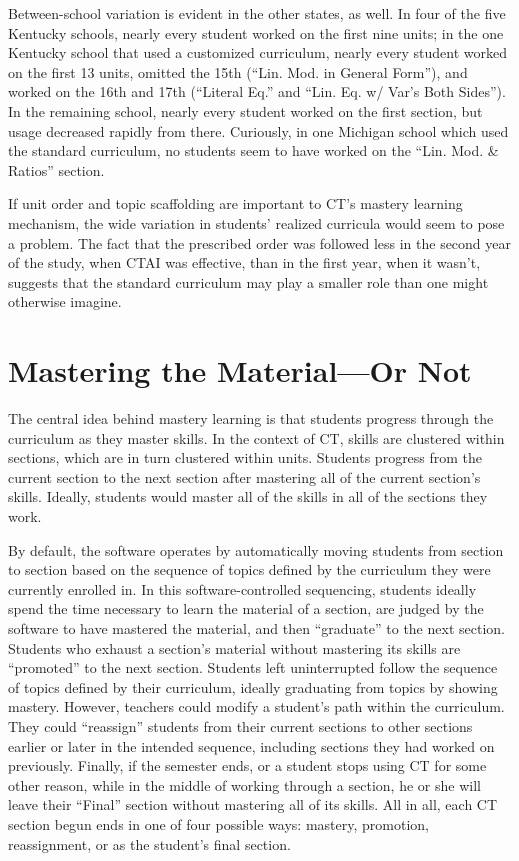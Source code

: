 \documentclass[12pt]{article}\usepackage[]{graphicx}\usepackage[]{color}
\begin{document}
Between-school variation is evident in the other states, as well.
In four of the five Kentucky schools, nearly every student worked on
the first nine units; in the one Kentucky school that used a
customized curriculum, nearly every student worked on the first 13
units, omitted the 15th (``Lin. Mod. in General Form''), and worked on
the 16th and 17th (``Literal Eq.'' and ``Lin. Eq. w/ Var's Both Sides'').
In the remaining school, nearly every student worked on the first
section, but usage decreased rapidly from there.
Curiously, in one Michigan school which used the standard curriculum,
no students seem to have worked on the ``Lin. Mod. \& Ratios'' section.

If unit order and topic scaffolding are important to CT's mastery
learning mechanism, the wide variation in students' realized curricula
would seem to pose a problem.
The fact that the prescribed order was followed less in the second
year of the study, when CTAI was effective, than in the first year,
when it wasn't, suggests that the standard curriculum may play a
smaller role than one might otherwise imagine.

\section{Mastering the Material---Or Not}\label{sec:mastery}
The central idea behind mastery learning is that students progress
through the curriculum as they master skills.
In the context of CT, skills are clustered within sections, which are
in turn clustered within units.
Students progress from the current section to the next section after
mastering all of the current section's skills.
Ideally, students would master all of the skills in all of the
sections they work.

By default, the software operates by automatically moving students
from section to section based on the sequence of topics defined by the
curriculum they were currently enrolled in. In this
software-controlled sequencing, students ideally spend the time
necessary to learn the material of a section, are judged by the
software to have mastered the material, and then ``graduate'' to the
next section. Students who exhaust a section's material without
mastering its skills are ``promoted'' to the next section.
Students left uninterrupted follow the sequence of topics defined by
their curriculum, ideally graduating from topics by showing mastery.
However, teachers could modify a student's path within the curriculum.
They could ``reassign'' students from their current sections to other
sections earlier or later in the intended sequence, including sections
they had worked on previously.
Finally, if the semester ends, or a student stops using CT for some
other reason, while in the middle of working through a
section, he or she will leave their ``Final'' section without
mastering all of its skills.
All in all, each CT section begun ends in one of four possible ways:
mastery, promotion, reassignment, or as the student's final section.
\end{document}
